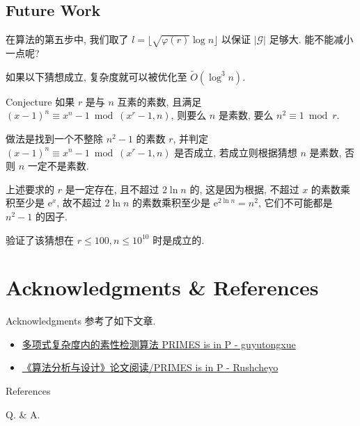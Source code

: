 \documentclass{beamer}
\def\le{\leqslant}
\begin{document}
\subsection{Future Work}
\begin{frame}{}
	在算法的第五步中, 我们取了 $l = \lfloor \sqrt{\varphi(r)}\log n \rfloor$ 以保证 $|\mathcal G|$ 足够大. 能不能减小一点呢?

	如果以下猜想成立, 复杂度就可以被优化至 $\tilde O(\log^3n)$.

	\begin{block}{Conjecture}
		如果 $r$ 是与 $n$ 互素的素数, 且满足 $(x - 1)^n \equiv x^n - 1 \bmod (x^r-1, n)$, 则要么 $n$ 是素数, 要么 $n^2 \equiv 1 \bmod r$.
	\end{block}

	做法是找到一个不整除 $n^2 - 1$ 的素数 $r$, 并判定 $(x - 1)^n \equiv x^n - 1 \bmod (x^r-1, n)$ 是否成立, 若成立则根据猜想 $n$ 是素数, 否则 $n$ 一定不是素数.

	上述要求的 $r$ 是一定存在, 且不超过 $2\ln n$ 的, 这是因为根据\cite{APO}, 不超过 $x$ 的素数乘积至少是 $\mathrm{e}^x$, 故不超过 $2 \ln n$ 的素数乘积至少是 $\mathrm{e}^{2 \ln n} = n^2$, 它们不可能都是 $n^2 - 1$ 的因子.

	\cite{KS} 验证了该猜想在 $r \le 100, n \le 10^{10}$ 时是成立的.
\end{frame}
\section{Acknowledgments \& References}
\begin{frame}[fragile]{Acknowledgments}
	参考了如下文章.
	\begin{itemize}
		\item \href{https://guyutongxue.github.io/blogs/primes_is_in_p.html}{\color{red} 多项式复杂度内的素性检测算法
		PRIMES is in P - guyutongxue}
		\item \href{https://www.bananaspace.org/wiki/%E7%94%A8%E6%88%B7:Rushcheyo/%E3%80%8A%E7%AE%97%E6%B3%95%E5%88%86%E6%9E%90%E4%B8%8E%E8%AE%BE%E8%AE%A1%E3%80%8B%E8%AE%BA%E6%96%87%E9%98%85%E8%AF%BB/PRIMES_is_in_P}{\color{red}《算法分析与设计》论文阅读/PRIMES is in P - Rushcheyo}
	\end{itemize}
\end{frame}
\begin{frame}[allowframebreaks]{References}
	
	
\end{frame}
\begin{frame}
	Q. \& A.
\end{frame}	
\end{document}
